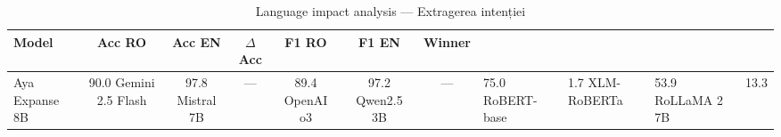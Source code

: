 \begin{table}[H]
\centering
\footnotesize
\caption{Language impact analysis — Extragerea intenției}
\label{tab:lang-impact-intent-extraction}
\begin{tabular}{lcccccc}
\toprule
\textbf{Model} & \textbf{Acc RO} & \textbf{Acc EN} & \textbf{$\Delta$Acc} & \textbf{F1 RO} & \textbf{F1 EN} & \textbf{Winner} \\
\midrule
Aya Expanse 8B & 90.0%
Gemini 2.5 Flash & 97.8%
Mistral 7B & — & 89.4%
OpenAI o3 & 97.2%
Qwen2.5 3B & — & 75.0%
RoBERT-base & 1.7%
XLM-RoBERTa & 53.9%
RoLLaMA 2 7B & 13.3%
\bottomrule
\end{tabular}
\end{table}